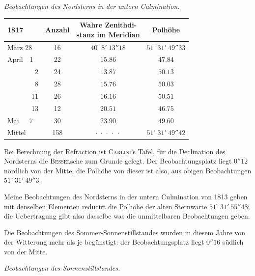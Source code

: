 \par\indent\emph{Beobachtungen des Nordsterns in der untern Culmination.}

\begin{center}\fontsize{10}{12}\selectfont\setlength{\tabcolsep}{3pt}
\begin{tabular}{l|c|c|c}
1817 & Anzahl & \shortstack{Wahre Zenithdi-\\stanz im Meridian} & Polhöhe \\
\hline
März 28 & 16 & $40^\circ\ 8'\ 13''18$ & $51^\circ\ 31'\ 49''33$ \\
April\ \ 1 & 22 & $15.86$ & $47.84$ \\
\ \ \ \ \ \ \ \ 2 & 24 & $13.87$ & $50.13$ \\
\ \ \ \ \ \ \ \ 8 & 28 & $15.76$ & $50.03$ \\
\ \ \ \ \ \ \ 11 & 26 & $16.16$ & $50.51$ \\
\ \ \ \ \ \ \ 13 & 12 & $20.51$ & $46.75$ \\
Mai\ \ \ 7 & 30 & $23.90$ & $49.60$ \\
Mittel & 158 & $\cdot\ \cdot\ \cdot\ \cdot\ \cdot$ & $51^\circ\ 31'\ 49''42$ \\
\end{tabular}
\end{center}

\par\indent Bei Berechnung der Refraction ist \textsc{Carlini}'s Tafel, für die Declination des Nordsterns die
\textsc{Bessel}sche zum Grunde gelegt. Der Beobachtungsplatz liegt $0''12$ nördlich von der Mitte; die
Polhöhe von dieser ist also, aus obigen Beobachtungen $51^\circ\ 31'\ 49''3$.

\par\indent Meine Beobachtungen des Nordsterns in der untern Culmination von 1813 geben mit denselben
Elementen reducirt die Polhöhe der alten Sternwarte $51^\circ\ 31'\ 55''48$; die Uebertragung
gibt also dasselbe was die unmittelbaren Beobachtungen geben.

\par\indent Die Beobachtungen des Sommer-Sonnenstillstandes wurden in diesem Jahre von der Witterung mehr
als je begünstigt: der Beobachtungsplatz liegt $0''16$ südlich von der Mitte.

\par\indent\emph{Beobachtungen des Sonnenstillstandes.}

